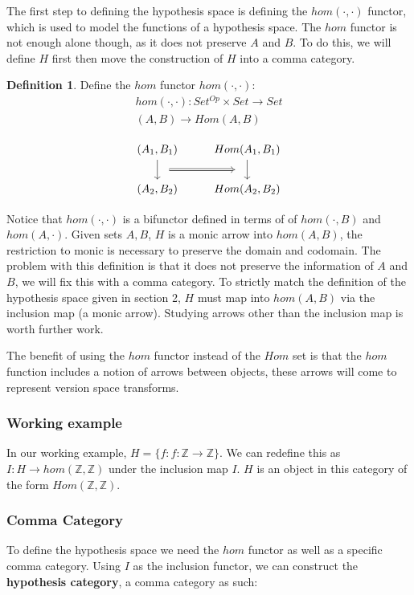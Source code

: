 \documentclass{article}
\theoremstyle{definition}
\newtheorem{definition}{Definition}[section]
\begin{document}
The first step to defining the hypothesis space is defining the $hom(\cdot, \cdot)$ functor, which is used to model the functions of a hypothesis space. The $hom$ functor is not enough alone though, as it does not preserve $A$ and $B$. To do this, we will define $H$ first then move the construction of $H$ into a comma category.
\begin{definition}
Define the $hom$ functor $hom(\cdot,\cdot)$:
\begin{gather*}
    hom(\cdot,\cdot):Set^{Op} \times Set \rightarrow Set \\
    (A,B) \rightarrow Hom(A,B) \\
\end{gather*}
\[\begin{tikzcd}
	{(A_1, B_1)} & {Hom(A_1, B_1)} \\
	{(A_2,B_2)} & {Hom(A_2,B_2)}
	\arrow[""{name=0, anchor=center, inner sep=0}, from=1-2, to=2-2]
	\arrow[""{name=1, anchor=center, inner sep=0}, from=1-1, to=2-1]
	\arrow[shorten <=10pt, shorten >=10pt, Rightarrow, from=1, to=0]
\end{tikzcd}\]
\end{definition}
Notice that $hom(\cdot, \cdot)$ is a bifunctor defined in terms of of $hom(\cdot,B)$ and $hom(A,\cdot)$. Given sets $A, B$, $H$ is a monic arrow into $hom(A,B)$, the restriction to monic is necessary to preserve the domain and codomain. The problem with this definition is that it does not preserve the information of $A$ and $B$, we will fix this with a comma category. To strictly match the definition of the hypothesis space given in section 2, $H$ must map into $hom(A,B)$ via the inclusion map (a monic arrow). Studying arrows other than the inclusion map is worth further work. 

The benefit of using the $hom$ functor instead of the $Hom$ set is that the $hom$ function includes a notion of arrows between objects, these arrows will come to represent version space transforms.

\subsubsection{Working example}
In our working example, $H=\{f: f: \mathbb{Z} \rightarrow \mathbb{Z}\}$. We can redefine this as $I: H\rightarrow hom(\mathbb{Z},\mathbb{Z})$ under the inclusion map $I$. $H$ is an object in this category of the form $Hom(\mathbb{Z},\mathbb{Z})$.

\subsubsection{Comma Category}
To define the hypothesis space we need the $hom$ functor as well as a specific comma category. Using $I$ as the inclusion functor, we can construct the \textbf{hypothesis category}, a comma category as such: 
\end{document}
